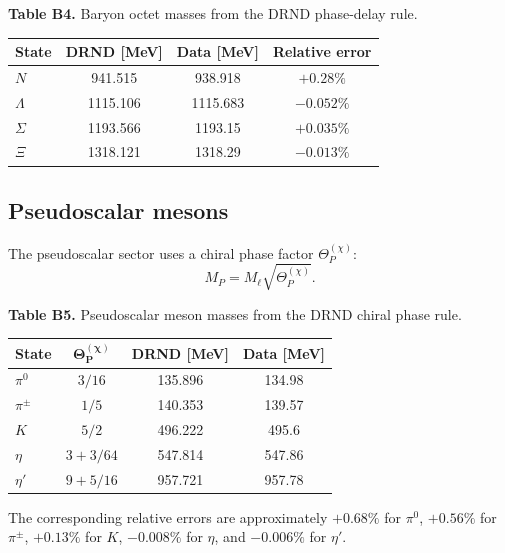\documentclass[12pt]{iopart}
\begin{document}
\noindent\textbf{Table B4.} Baryon octet masses from the DRND phase-delay rule.

\begin{center}
\small
\begin{tabular}{lccc}
\hline
\textbf{State} & \textbf{DRND [MeV]} & \textbf{Data [MeV]} & \textbf{Relative error} \\
\hline
\(N\)        & 941.515  & 938.918  & \(+0.28\%\) \\
\(\Lambda\) & 1115.106 & 1115.683 & \(-0.052\%\) \\
\(\Sigma\)  & 1193.566 & 1193.15  & \(+0.035\%\) \\
\(\Xi\)     & 1318.121 & 1318.29  & \(-0.013\%\) \\
\hline
\end{tabular}
\end{center}

\subsection{Pseudoscalar mesons}

The pseudoscalar sector uses a chiral phase factor \(\Theta_P^{(\chi)}\):
\begin{equation}
M_P
=
M_\ell
\sqrt{\Theta_P^{(\chi)}}.
\label{eq:pseudoscalar_rule}
\end{equation}

\noindent\textbf{Table B5.} Pseudoscalar meson masses from the DRND chiral phase rule.

\begin{center}
\small
\begin{tabular}{lccc}
\hline
\textbf{State} & \(\boldsymbol{\Theta_P^{(\chi)}}\) & \textbf{DRND [MeV]} & \textbf{Data [MeV]} \\
\hline
\(\pi^0\)   & \(3/16\)     & 135.896 & 134.98 \\
\(\pi^\pm\)& \(1/5\)      & 140.353 & 139.57 \\
\(K\)       & \(5/2\)      & 496.222 & 495.6 \\
\(\eta\)   & \(3+3/64\)   & 547.814 & 547.86 \\
\(\eta'\)  & \(9+5/16\)   & 957.721 & 957.78 \\
\hline
\end{tabular}
\end{center}

The corresponding relative errors are approximately \(+0.68\%\) for \(\pi^0\), \(+0.56\%\) for \(\pi^\pm\), \(+0.13\%\) for \(K\), \(-0.008\%\) for \(\eta\), and \(-0.006\%\) for \(\eta'\).
\end{document}
